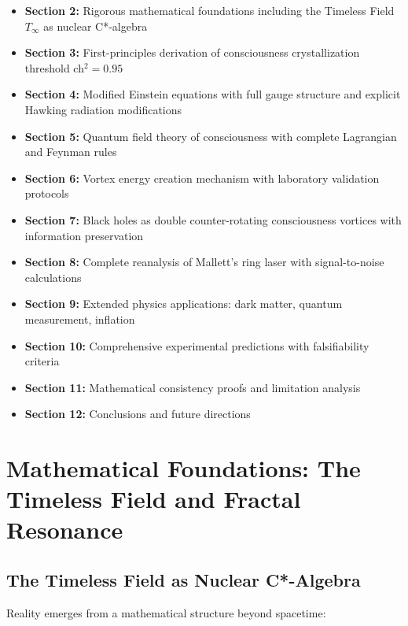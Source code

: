 \documentclass[11pt]{article}
\theoremstyle{definition}
\begin{document}
\begin{itemize}
\item \textbf{Section 2:} Rigorous mathematical foundations including the Timeless Field $T_\infty$ as nuclear C*-algebra
\item \textbf{Section 3:} First-principles derivation of consciousness crystallization threshold ch$^2 = 0.95$
\item \textbf{Section 4:} Modified Einstein equations with full gauge structure and explicit Hawking radiation modifications
\item \textbf{Section 5:} Quantum field theory of consciousness with complete Lagrangian and Feynman rules
\item \textbf{Section 6:} Vortex energy creation mechanism with laboratory validation protocols
\item \textbf{Section 7:} Black holes as double counter-rotating consciousness vortices with information preservation
\item \textbf{Section 8:} Complete reanalysis of Mallett's ring laser with signal-to-noise calculations
\item \textbf{Section 9:} Extended physics applications: dark matter, quantum measurement, inflation
\item \textbf{Section 10:} Comprehensive experimental predictions with falsifiability criteria
\item \textbf{Section 11:} Mathematical consistency proofs and limitation analysis
\item \textbf{Section 12:} Conclusions and future directions
\end{itemize}

\section{Mathematical Foundations: The Timeless Field and Fractal Resonance}

\subsection{The Timeless Field as Nuclear C*-Algebra}

Reality emerges from a mathematical structure beyond spacetime:
\end{document}

